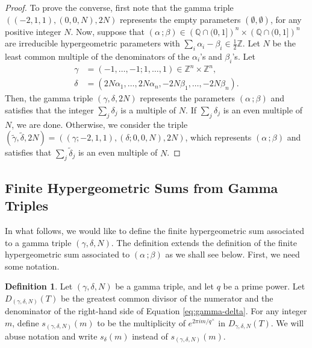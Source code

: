 \documentclass[11pt, reqno]{amsart}
\theoremstyle{plain}
\theoremstyle{definition}
\newtheorem{defi}[theo]{Definition}
\newcommand{\Z}{\mathbb{Z}}
\newcommand{\Q}{\mathbb{Q}}
\newcommand{\ga}{\gamma}
\newcommand{\be}{\beta}
\newcommand{\al}{\alpha}
\begin{document}
\begin{proof}
To prove the converse, first note that the gamma triple $((-2,1,1),(0,0,N),2N)$ represents the empty parameters $(\emptyset,\emptyset)$, for any positive integer $N$.
Now, suppose that $(\al \,; \be) \in \left(\Q \cap (0,1]\right)^{n} \times \left(\Q \cap (0,1]\right)^{n}$ are irreducible hypergeometric parameters with $\sum_i \al_i - \be_i \in \frac{1}{2} \Z$. Let $N$ be the least common multiple of the denominators of the $\al_i$'s and $\be_i$'s. 
Let
\begin{align*}
    \ga &= (-1, \dots, -1; 1, \dots, 1) \in \Z^{n}\times \Z^n, \\
    \delta&= (2N\al_1, \dots, 2N\al_n, -2N\be_1, \dots, -2N\be_n).
\end{align*}
Then, the gamma triple $(\ga, \delta, 2N)$ represents the parameters $(\al \, ; \be)$ and satisfies that the integer $\sum_j \delta_j$ is a multiple of $N$. If $\sum_j \delta_j$ is an even multiple of $N$, we are done. Otherwise, we consider the triple 
$(\tilde{\ga},\tilde{\delta},2N)= ((\ga;-2,1,1),(\delta;0,0,N),2N)$, which represents $(\al \, ; \be)$ and satisfies that $\sum_{j} \tilde{\delta}_j $ is an even multiple of $N$.
\end{proof}



\subsection{Finite Hypergeometric Sums from Gamma Triples}
In what follows, we would like to define the finite hypergeometric sum associated to a gamma triple $(\ga,\delta,N)$. The definition extends the definition of the finite hypergeometric sum associated to $(\al \,; \be)$ as we shall see below. First, we need some notation.


\begin{defi}\label{defi:s-delta}
    Let $(\ga,\delta,N)$ be a gamma triple, and let $q$ be a prime power. Let $D_{(\ga,\delta,N)}(T)$  be the greatest common divisor of the numerator and the denominator of the right-hand side of Equation \eqref{eq:gamma-delta}. 
    For any integer $m$, define $s_{(\ga,\delta,N)}(m)$ to be the multiplicity of  $e^{2 \pi i m/ q^\times}$ in $D_{\ga,\delta,N}(T)$. We will abuse notation and write $s_{\delta}(m)$ instead of $s_{(\ga,\delta,N)}(m)$.
\end{defi}
\end{document}
